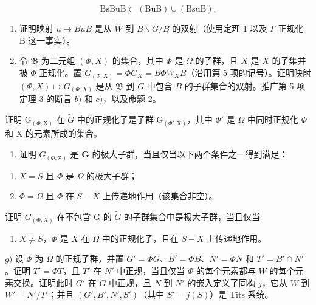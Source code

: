 \[
\mathrm{BsBuB} \subset (\mathrm{BuB}) \cup (\mathrm{BsuB}).
\]

\begin{enumerate}
\def\labelenumi{\alph{enumi})}
\setcounter{enumi}{3}
\item
  证明映射 \(u \mapsto BuB\) 是从 \(\tilde{W}\) 到 \(B\backslash\tilde{G}/B\) 的双射（使用定理 1 以及 \(\Gamma\) 正规化 B 这一事实）。
\item
  令 \(\mathfrak{B}\) 为二元组 \((\varPhi, X)\) 的集合，其中 \(\varPhi\) 是 \(\Omega\) 的子群，且 \(X\) 是 \(X\) 的子集并被 \(\varPhi\) 正规化。置 \(G_{(\varPhi, X)} = \varPhi G_X = B \varPhi W_X B\)（沿用第 5 项的记号）。证明映射 \((\varPhi, X) \mapsto G_{(\varPhi, X)}\) 是从 \(\mathfrak{B}\) 到 \(\tilde{G}\) 中包含 \(B\) 的子群集合的双射。推广第 5 项定理 3 的断言 \(b)\) 和 \(c)\)，以及命题 2。
\end{enumerate}

证明 \(\mathrm{G}_{(\varPhi,\mathrm{X})}\) 在 \(\tilde{G}\) 中的正规化子是子群 \(\mathrm{G}_{(\varPhi',\mathrm{X})}\)，其中 \(\varPhi'\) 是 \(\Omega\) 中同时正规化 \(\varPhi\) 和 X 的元素所成的集合。

\begin{enumerate}
\def\labelenumi{\alph{enumi})}
\setcounter{enumi}{5}
\tightlist
\item
  证明 \(G_{(\Phi, \mathsf{X})}\) 是 \(\tilde{\mathbf{G}}\) 的极大子群，当且仅当以下两个条件之一得到满足：
\end{enumerate}

\begin{enumerate}
\def\labelenumi{(\roman{enumi})}
\item
  \(X = S\) 且 \(\varPhi\) 是 \(\varOmega\) 的极大子群；
\item
  \(\Phi = \Omega\) 且 \(\Phi\) 在 \(S - X\) 上传递地作用（该集合非空）。
\end{enumerate}

证明 \(G_{(\Phi,X)}\) 在不包含 G 的 \(\tilde{G}\) 的子群集合中是极大子群，当且仅当

\begin{enumerate}
\def\labelenumi{(\roman{enumi})}
\setcounter{enumi}{2}
\tightlist
\item
  \(X \neq S\)，\(\Phi\) 是 \(X\) 在 \(\Omega\) 中的正规化子，且在 \(S - X\) 上传递地作用。
\end{enumerate}

\(g)\) 设 \(\Phi\) 为 \(\Omega\) 的正规子群，并置 \(G' = \Phi G\)、\(B' = \Phi B\)、\(N' = \Phi N\) 和 \(T' = B' \cap N'\)。证明 \(T' = \Phi \tilde{T}\)，且 \(T'\) 在 \(N'\) 中正规，当且仅当 \(\Phi\) 的每个元素都与 \(W\) 的每个元素交换。证明此时 \(G'\) 在 \(\tilde{G}\) 中正规，且 \(N\) 到 \(N'\) 的嵌入定义了同构 \(j\)，它从 \(W\) 到 \(W' = N'/T'\)；并且 \((G', B', N', S')\)（其中 \(S' = j(S)\)）是 Tits 系统。

